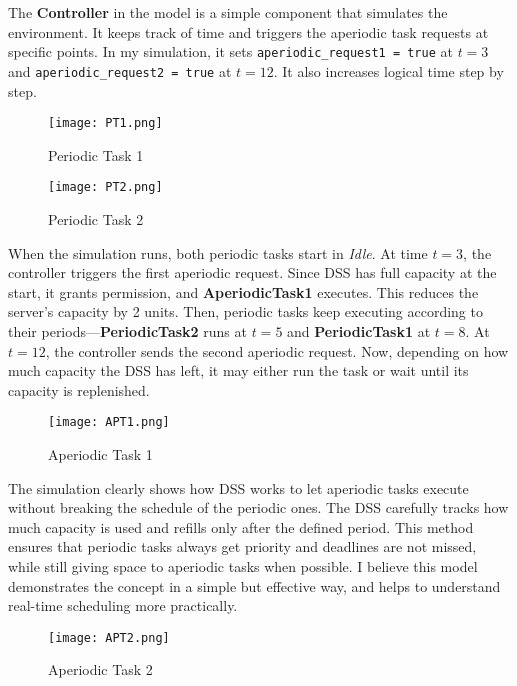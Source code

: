 \documentclass[conference]{IEEEtran}
\begin{document}
The \textbf{Controller} in the model is a simple component that simulates the environment. It keeps track of time and triggers the aperiodic task requests at specific points. In my simulation, it sets \texttt{aperiodic\_request1 = true} at $t = 3$ and \texttt{aperiodic\_request2 = true} at $t = 12$. It also increases logical time step by step.
\begin{figure}
        \centering
        \texttt{[image: PT1.png]}
        \caption{Periodic Task 1}

                \label{fig:enter-label}
    \end{figure}
\begin{figure}
            \centering
            \texttt{[image: PT2.png]}
            \caption{Periodic Task 2}

                        \label{fig:enter-label}
        \end{figure}
When the simulation runs, both periodic tasks start in \textit{Idle}. At time $t = 3$, the controller triggers the first aperiodic request. Since DSS has full capacity at the start, it grants permission, and \textbf{AperiodicTask1} executes. This reduces the server's capacity by 2 units. Then, periodic tasks keep executing according to their periods---\textbf{PeriodicTask2} runs at $t = 5$ and \textbf{PeriodicTask1} at $t = 8$. At $t = 12$, the controller sends the second aperiodic request. Now, depending on how much capacity the DSS has left, it may either run the task or wait until its capacity is replenished.
\begin{figure}
                \centering
                \texttt{[image: APT1.png]}
                \caption{Aperiodic Task 1}
                \label{fig:enter-label}
            \end{figure}
The simulation clearly shows how DSS works to let aperiodic tasks execute without breaking the schedule of the periodic ones. The DSS carefully tracks how much capacity is used and refills only after the defined period. This method ensures that periodic tasks always get priority and deadlines are not missed, while still giving space to aperiodic tasks when possible. I believe this model demonstrates the concept in a simple but effective way, and helps to understand real-time scheduling more practically.
\begin{figure}
    \centering
    \texttt{[image: APT2.png]}
    \caption{Aperiodic Task 2}
    \label{fig:enter-label}
\end{figure}
\end{document}

